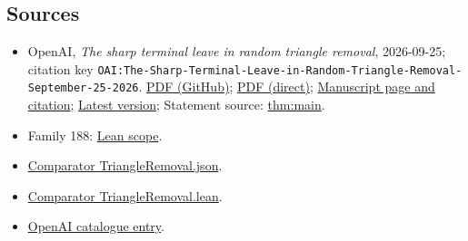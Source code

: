 \documentclass[11pt]{article}
\begin{document}
\subsection{Sources}
\begin{itemize}
\item OpenAI, \emph{The sharp terminal leave in random triangle removal}, 2026-09-25; citation key \texttt{OAI:The-Sharp-Terminal-Leave-in-Random-Triangle-Removal-September-25-2026}. \href{https://github.com/openai/math/blob/adc7f1241b42e322a6451854ab7e4b4c146bf78a/preprints/The-Sharp-Terminal-Leave-in-Random-Triangle-Removal-September-25-2026/The-Sharp-Terminal-Leave-in-Random-Triangle-Removal-September-25-2026.pdf}{PDF (GitHub)}; \href{https://github.com/openai/math/raw/adc7f1241b42e322a6451854ab7e4b4c146bf78a/preprints/The-Sharp-Terminal-Leave-in-Random-Triangle-Removal-September-25-2026/The-Sharp-Terminal-Leave-in-Random-Triangle-Removal-September-25-2026.pdf}{PDF (direct)}; \href{https://github.com/openai/math/blob/adc7f1241b42e322a6451854ab7e4b4c146bf78a/preprints/The-Sharp-Terminal-Leave-in-Random-Triangle-Removal-September-25-2026/README.md}{Manuscript page and citation}; \href{https://github.com/openai/math/blob/main/preprints/The-Sharp-Terminal-Leave-in-Random-Triangle-Removal-September-25-2026/The-Sharp-Terminal-Leave-in-Random-Triangle-Removal-September-25-2026.pdf}{Latest version}; Statement source: \href{https://github.com/openai/math/blob/adc7f1241b42e322a6451854ab7e4b4c146bf78a/preprints/The-Sharp-Terminal-Leave-in-Random-Triangle-Removal-September-25-2026/build/introduction.tex\#L36}{thm:main}.
\item Family 188: \href{https://github.com/openai/math/blob/adc7f1241b42e322a6451854ab7e4b4c146bf78a/lean/docs/188.md}{Lean scope}.
\item \href{https://github.com/openai/math/blob/adc7f1241b42e322a6451854ab7e4b4c146bf78a/lean/ComparatorChallenges/TriangleRemoval.json}{Comparator TriangleRemoval.json}.
\item \href{https://github.com/openai/math/blob/adc7f1241b42e322a6451854ab7e4b4c146bf78a/lean/ComparatorChallenges/TriangleRemoval.lean}{Comparator TriangleRemoval.lean}.
\item \href{https://github.com/openai/math/blob/adc7f1241b42e322a6451854ab7e4b4c146bf78a/CONTENTS.md}{OpenAI catalogue entry}.
\end{itemize}
\end{document}
